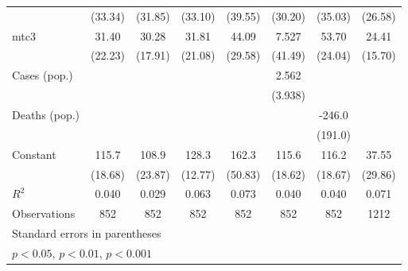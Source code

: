 \documentclass{article}
\begin{document}
{\begin{longtable}{l*{7}{c}}
                &  (33.34)         &  (31.85)         &  (33.10)         &  (39.55)         &  (30.20)         &  (35.03)         &  (26.58)         \\
mtc3            &    31.40         &    30.28         &    31.81         &    44.09         &    7.527         &    53.70         &    24.41         \\
                &  (22.23)         &  (17.91)         &  (21.08)         &  (29.58)         &  (41.49)         &  (24.04)         &  (15.70)         \\
Cases (pop.)    &                  &                  &                  &                  &    2.562         &                  &                  \\
                &                  &                  &                  &                  &  (3.938)         &                  &                  \\
Deaths (pop.)   &                  &                  &                  &                  &                  &   -246.0         &                  \\
                &                  &                  &                  &                  &                  &  (191.0)         &                  \\
Constant        &    115.7\sym{**} &    108.9\sym{**} &    128.3\sym{***}&    162.3\sym{*}  &    115.6\sym{**} &    116.2\sym{**} &    37.55         \\
                &  (18.68)         &  (23.87)         &  (12.77)         &  (50.83)         &  (18.62)         &  (18.67)         &  (29.86)         \\
\hline
\(R^{2}\)       &    0.040         &    0.029         &    0.063         &    0.073         &    0.040         &    0.040         &    0.071         \\
Observations    &      852         &      852         &      852         &      852         &      852         &      852         &     1212         \\
\hline\hline
\multicolumn{8}{l}{\footnotesize Standard errors in parentheses}\\
\multicolumn{8}{l}{\footnotesize \sym{*} \(p<0.05\), \sym{**} \(p<0.01\), \sym{***} \(p<0.001\)}\\
\end{longtable}
}
\end{document}
